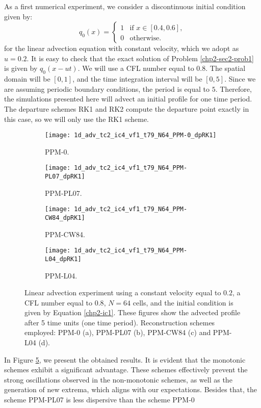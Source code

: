 As a first numerical experiment, we consider
a discontinuous initial condition given by:
\begin{equation}
	\label{chp2-ic1}
		q_0(x) =  
  \begin{cases}
		1 & \text{if } x \in [0.4,0.6],\\
		0 & \text{otherwise}.
  \end{cases}
\end{equation}
for the linear advection equation with constant velocity, which we adopt as $u=0.2$.
It is easy to check that the exact solution of Problem \ref{chp2-sec2-prob1} is given
by $q_0(x-ut)$. We will use a CFL number equal to $0.8$. The spatial domain will be
$[0,1]$, and the time integration interval will be $[0,5]$. Since we are assuming
periodic boundary conditions, the period is equal to $5$. Therefore, the simulations
presented here will advect an initial profile for one time period.
The departure schemes RK1 and RK2 compute the departure point exactly in this case, so we will only use the RK1 scheme.
\begin{figure}[!htb]
  \centering
  \begin{subfigure}{0.45\textwidth}
    \centering
			\texttt{[image: 1d\_adv\_tc2\_ic4\_vf1\_t79\_N64\_PPM-0\_dpRK1]}
			\caption{PPM-0.\label{chp2-sec-exp-adv1-a}}
  \end{subfigure}
  \begin{subfigure}{0.45\textwidth}
    \centering
			\texttt{[image: 1d\_adv\_tc2\_ic4\_vf1\_t79\_N64\_PPM-PL07\_dpRK1]}
			\caption{PPM-PL07.\label{chp2-sec-exp-adv1-b}}
  \end{subfigure}

  \begin{subfigure}{0.45\textwidth}
    \centering
		\texttt{[image: 1d\_adv\_tc2\_ic4\_vf1\_t79\_N64\_PPM-CW84\_dpRK1]}
    \caption{PPM-CW84.\label{chp2-sec-exp-adv1-c}}
  \end{subfigure}
  \begin{subfigure}{0.45\textwidth}
    \centering
			\texttt{[image: 1d\_adv\_tc2\_ic4\_vf1\_t79\_N64\_PPM-L04\_dpRK1]}
      \caption{PPM-L04.\label{chp2-sec-exp-adv1-d}}
  \end{subfigure} 
	\caption{Linear advection experiment using a constant velocity equal to $0.2$,
		a CFL number equal to $0.8$, $N=64$ cells, and the initial condition is given by Equation \eqref{chp2-ic1}.
		These figures show the advected profile after 5 time units (one time period).
		Reconstruction schemes employed: PPM-0 (a), PPM-PL07 (b), PPM-CW84
		(c) and PPM-L04 (d).\label{chp2-sec-exp-adv1}}
\end{figure}
In Figure \ref{chp2-sec-exp-adv1}, we present the obtained results.
It is evident that the monotonic schemes exhibit a significant advantage.
These schemes effectively prevent the strong oscillations observed in the non-monotonic schemes,
as well as the generation of new extrema, which aligns with our expectations.
Besides that, the scheme PPM-PL07 is less dispersive than the scheme PPM-0

